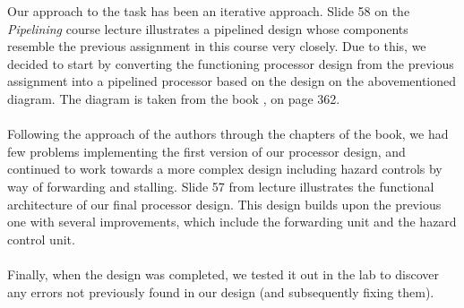 Our approach to the task has been an iterative approach. Slide 58 on the
\emph{Pipelining} \cite{slides-6} course lecture illustrates a pipelined design
whose components resemble the previous assignment in this course very closely.
Due to this, we decided to start by converting the functioning processor design
from the previous assignment into a pipelined processor based on the design on
the abovementioned diagram. The diagram is taken from the book
\cite{patterson12}, on page 362.
\paragraph*{}
Following the approach of the authors through the chapters of the book, we had
few problems implementing the first version of our processor design, and
continued to work towards a more complex design including hazard controls by way
of forwarding and stalling. Slide 57 from lecture \cite{slides-7} illustrates
the functional architecture of our final processor design. This design builds
upon the previous one with several improvements, which include the forwarding
unit and the hazard control unit.
\paragraph*{}
Finally, when the design was completed, we tested it out in the lab to discover
any errors not previously found in our design (and subsequently fixing them).
